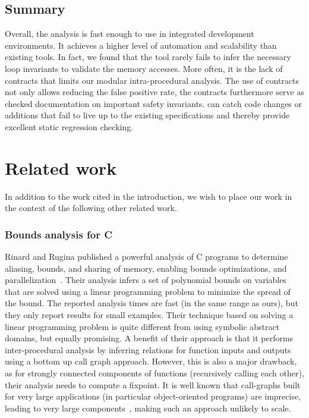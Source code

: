 \documentclass[10pt]{sigplanconf}
\begin{document}
\subsection{Summary}
Overall, the analysis is fast enough to use in integrated development
environments. It achieves a higher level of
automation and scalability than existing tools. In fact, we found that
the tool rarely fails to infer the necessary loop invariants to
validate the memory accesses. More often, it is the lack of contracts
that limits our modular intra-procedural analysis. The
use of contracts not only allows reducing the false positive rate, the
contracts furthermore serve as checked documentation on important
safety invariants. \Clousot{} can catch
code changes or additions that fail to live up to the existing
specifications and thereby provide excellent static regression
checking. 

\section{Related work}
In addition to the work cited in the introduction, we wish to place
our work in the context of the following other related work.

\subsubsection*{Bounds analysis for C}
Rinard and Rugina published a powerful analysis of C programs to
determine aliasing, bounds, and sharing of memory, enabling bounds
optimizations, and parallelization~\cite{rugina00,rinardrugina}. Their analysis
infers a set of polynomial bounds on variables that are solved using a
linear programming problem to minimize the spread of the bound. The
reported analysis times are fast (in the same range as ours), but they
only report results for small examples. Their technique based on
solving a linear programming problem is quite different from using
symbolic abstract domains, but equally promising. A benefit of their
approach is that it performs inter-procedural analysis by inferring
relations for function inputs and outputs using a bottom up call graph
approach. However, this is also a major drawback, as for strongly
connected components of functions (recursively calling each other),
their analysis needs to compute a fixpoint. It is well known that
call-graphs built for very large applications (in particular
object-oriented programs) are imprecise, leading to very large
components~\cite{onelevelflow}, making such an approach unlikely to scale.
\end{document}
